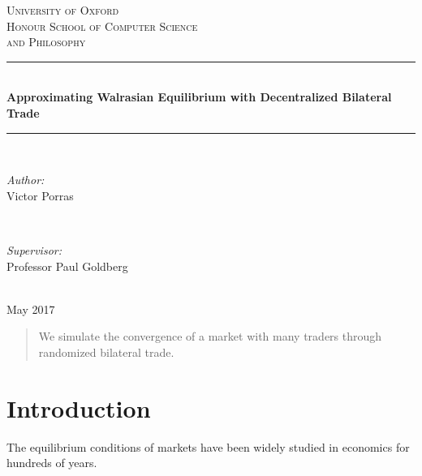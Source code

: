 \documentclass[12pt,a4paper,titlepage]{article}
\begin{document}
\begin{titlepage}

\newcommand{\HRule}{\rule{\linewidth}{0.5mm}} %

\center %
 
\textsc{\LARGE University of Oxford}\\[1.5cm] %
\textsc{\LARGE Honour School of Computer Science \\[0.2cm] and Philosophy}\\[0.5cm] %

\HRule \\[0.4cm]
{ \LARGE \bfseries Approximating Walrasian Equilibrium with Decentralized Bilateral Trade}\\[0.4cm] %
\HRule \\[2cm]
 
\begin{minipage}{0.45\textwidth}
\begin{flushleft} \Large
\emph{Author:}\\
Victor Porras %
\end{flushleft}
\end{minipage}
~
\begin{minipage}{0.45\textwidth}
\begin{flushright} \Large
\emph{Supervisor:} \\
Professor Paul Goldberg %
\end{flushright}
\end{minipage}\\[2cm]

{\Large {May 2017}}\\[2cm]

 

\vfill %

\end{titlepage}

\begin{abstract}
  We simulate the convergence of a market with many traders through randomized bilateral trade.
\end{abstract}

\section{Introduction}
The equilibrium conditions of markets have been widely studied in economics for hundreds of years.
\end{document}
